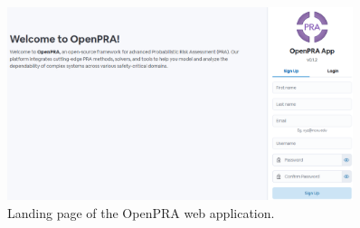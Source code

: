 \begin{figure}[h!]
  \centering
  \includegraphics[width=0.9\textwidth]{4_proposed_solution/web_app/figures/landing_page.png}
  \caption{Landing page of the OpenPRA web application.}
  \label{fig:landing_page}
\end{figure}